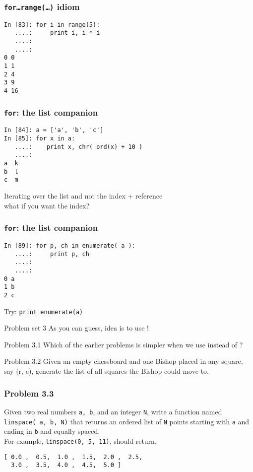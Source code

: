 \documentclass[14pt,compress]{beamer}
\newcounter{time}
\newcommand{\inctime}[1]{\addtocounter{time}{#1}{\tiny \thetime\ m}}
\newcommand{\typ}[1]{\texttt{#1}}
\newcommand{\kwrd}[1]{ \texttt{\textbf{\color{blue}{#1}}}  }
\begin{document}
\begin{frame}[fragile]
  \frametitle{\typ{for\ldots range(\ldots)} idiom}
  \begin{lstlisting}
In [83]: for i in range(5):
   ....:     print i, i * i
   ....:     
   ....:     
0 0
1 1
2 4
3 9
4 16
\end{lstlisting}
\end{frame}

\begin{frame}[fragile]
  \frametitle{\typ{for}: the list companion}
  
  \begin{lstlisting}
In [84]: a = ['a', 'b', 'c']
In [85]: for x in a:
   ....:    print x, chr( ord(x) + 10 )
   ....:
a  k
b  l
c  m
  \end{lstlisting}
  Iterating over the list and not the index + reference\\
  what if you want the index?
\end{frame}

\begin{frame}[fragile]
  \frametitle{\typ{for}: the list companion}
  \begin{lstlisting}
In [89]: for p, ch in enumerate( a ):
   ....:     print p, ch
   ....:     
   ....:     
0 a
1 b
2 c
  \end{lstlisting}
Try: \typ{print enumerate(a)}
\inctime{20}
\end{frame}


\begin{frame}
  {Problem set 3}
  As you can guess, idea is to use \kwrd{for}!
\end{frame}

\begin{frame}{Problem 3.1}
  Which of the earlier problems is simpler when we use \kwrd{for} instead of \kwrd{while}? 
\end{frame}

\begin{frame}{Problem 3.2}
  Given an empty chessboard and one Bishop placed in any square, say (r, c), generate the list of all squares the Bishop could move to.
\end{frame}

\begin{frame}[fragile]
  \frametitle{Problem 3.3}

  Given two real numbers \typ{a, b}, and an integer \typ{N}, write a
  function named \typ{linspace( a, b, N)} that returns an ordered list
  of \typ{N} points starting with \typ{a} and ending in \typ{b} and
  equally spaced.\\

  For example, \typ{linspace(0, 5, 11)}, should return, \\
\begin{lstlisting}
[ 0.0 ,  0.5,  1.0 ,  1.5,  2.0 ,  2.5,  
  3.0 ,  3.5,  4.0 ,  4.5,  5.0 ]
\end{lstlisting}
\end{frame}
\end{document}
